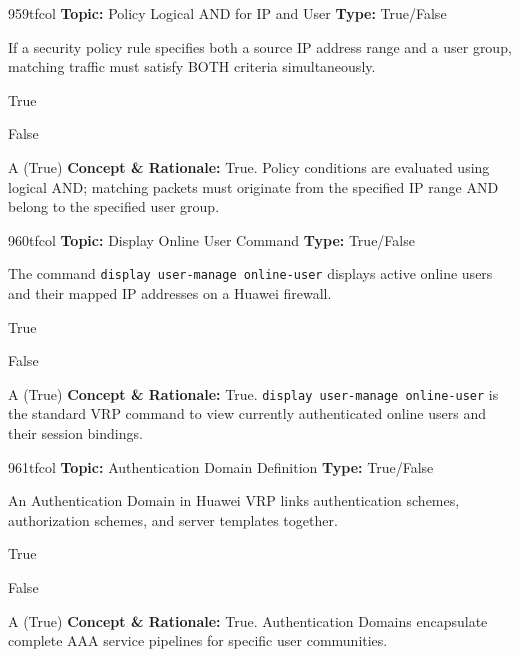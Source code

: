 \begin{qcard}{959}{tfcol}
\textcolor{darkslate!75}{\small\textbf{Topic:} Policy Logical AND for IP and User \hfill \textbf{Type:} True/False}\vspace{0.4em}\par
If a security policy rule specifies both a source IP address range and a user group, matching traffic must satisfy BOTH criteria simultaneously.
\begin{qoptions}
\item True
\item False
\end{qoptions}
\end{qcard}
\nopagebreak
\begin{explainbox}{A (True)}
\textbf{Concept \& Rationale:} True. Policy conditions are evaluated using logical AND; matching packets must originate from the specified IP range AND belong to the specified user group.
\end{explainbox}

\begin{qcard}{960}{tfcol}
\textcolor{darkslate!75}{\small\textbf{Topic:} Display Online User Command \hfill \textbf{Type:} True/False}\vspace{0.4em}\par
The command \texttt{display user-manage online-user} displays active online users and their mapped IP addresses on a Huawei firewall.
\begin{qoptions}
\item True
\item False
\end{qoptions}
\end{qcard}
\nopagebreak
\begin{explainbox}{A (True)}
\textbf{Concept \& Rationale:} True. \texttt{display user-manage online-user} is the standard VRP command to view currently authenticated online users and their session bindings.
\end{explainbox}

\begin{qcard}{961}{tfcol}
\textcolor{darkslate!75}{\small\textbf{Topic:} Authentication Domain Definition \hfill \textbf{Type:} True/False}\vspace{0.4em}\par
An Authentication Domain in Huawei VRP links authentication schemes, authorization schemes, and server templates together.
\begin{qoptions}
\item True
\item False
\end{qoptions}
\end{qcard}
\nopagebreak
\begin{explainbox}{A (True)}
\textbf{Concept \& Rationale:} True. Authentication Domains encapsulate complete AAA service pipelines for specific user communities.
\end{explainbox}

